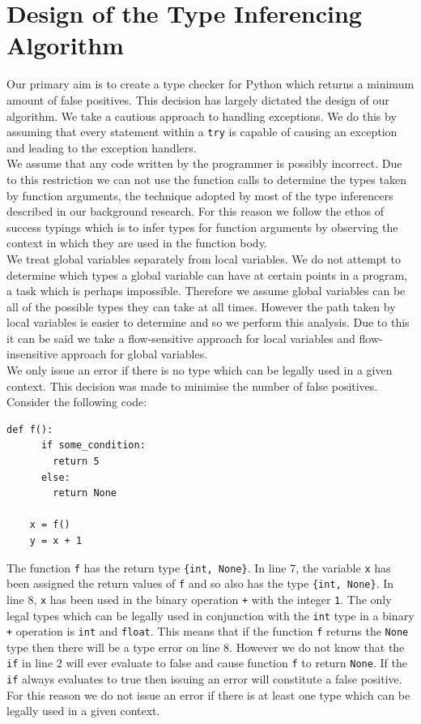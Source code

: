 \documentclass[12pt, titlepage]{article}
\begin{document}
\section{Design of the Type Inferencing Algorithm}
Our primary aim is to create a type checker for Python which returns a minimum amount of false positives. This decision has largely dictated the design of our algorithm. We take a cautious approach to handling exceptions. We do this by assuming that every statement within a \texttt{try} is capable of causing an exception and leading to the exception handlers. \\
\indent We assume that any code written by the programmer is possibly incorrect. Due to this restriction we can not use the function calls to determine the types taken by function arguments, the technique adopted by most of the type inferencers described in our background research. For this reason we follow the ethos of success typings which is to infer types for function arguments by observing the context in which they are used in the function body. \\
\indent We treat global variables separately from local variables. We do not attempt to determine which types a global variable can have at certain points in a program, a task which is perhaps impossible. Therefore we assume global variables can be all of the possible types they can take at all times. However the path taken by local variables is easier to determine and so we perform this analysis. Due to this it can be said we take a flow-sensitive approach for local variables and flow-insensitive approach for global variables. \\
\indent We only issue an error if there is no type which can be legally used in a given context. This decision was made to minimise the number of false positives. Consider the following code:
\begin{lstlisting}[mathescape]
    def f():
      if some_condition:
        return 5
      else:
        return None
        
    x = f()
    y = x + 1
\end{lstlisting}
The function \texttt{f} has the return type \texttt{\{int, None\}}. In line 7, the variable \texttt{x} has been assigned the return values of \texttt{f} and so also has the type \texttt{\{int, None\}}. In line 8, \texttt{x} has been used in the binary operation \texttt{+} with the integer \texttt{1}. The only legal types which can be legally used in conjunction with the \texttt{int} type in a binary \texttt{+} operation is \texttt{int} and \texttt{float}. This means that if the function \texttt{f} returns the \texttt{None} type then there will be a type error on line 8. However we do not know that the \texttt{if} in line 2 will ever evaluate to false and cause function \texttt{f} to return \texttt{None}. If the \texttt{if} always evaluates to true then issuing  an error will constitute a false positive. For this reason we do not issue an error if there is at least one type which can be legally used in a given context.
\end{document}
